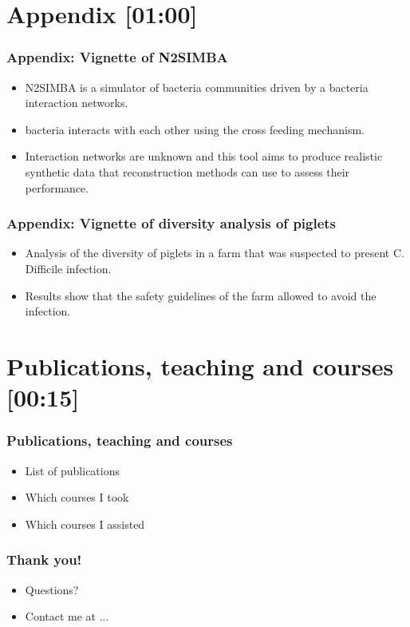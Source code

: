 \section{Appendix {[01:00]}}

\begin{frame}
    \frametitle{Appendix: Vignette of N2SIMBA}
    \begin{block}{}
        \begin{itemize}
            \item N2SIMBA is a simulator of bacteria communities driven by a bacteria interaction networks.
            \item bacteria interacts with each other using the cross feeding mechanism.
            \item Interaction networks are unknown and this tool aims to produce realistic synthetic data that reconstruction methods can use to assess their performance.
        \end{itemize}
    \end{block}
\end{frame}

\begin{frame}
    \frametitle{Appendix: Vignette of diversity analysis of piglets}
    \begin{block}{}
        \begin{itemize}
            \item Analysis of the diversity of piglets in a farm that was suspected to present C. Difficile infection.
            \item Results show that the safety guidelines of the farm allowed to avoid the infection.
        \end{itemize}
    \end{block}
\end{frame}

\section{Publications, teaching and courses {[00:15]}}

\begin{frame}
    \frametitle{Publications, teaching and courses}
    \begin{block}{}
        \begin{itemize}
            \item List of publications
            \item Which courses I took
            \item Which courses I assisted
        \end{itemize}
    \end{block}
\end{frame}

\begin{frame}
    \frametitle{Thank you!}
    \begin{block}{}
        \begin{itemize}
            \item Questions?
            \item Contact me at ...
        \end{itemize}
    \end{block}
\end{frame}
